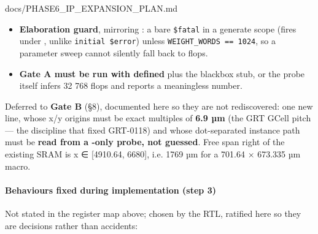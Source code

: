 \begin{relocated}{docs/PHASE6_IP_EXPANSION_PLAN.md}
\begin{itemize}
  regex , matched against the leaf instance name,
  so reusing the name means \textbf{zero config change}; any other name
  silently leaves vccd1/\allowbreak{}vssd1 unconnected, which is the
  PSM-0069 class this flow already fought.
\item
  \textbf{Elaboration guard}, mirroring
  : a bare \texttt{\$fatal} in a
  generate scope (fires under , unlike
  \texttt{initial\ \$error}) unless
  \texttt{WEIGHT\_\allowbreak{}WORDS\ =\allowbreak{}=\allowbreak{}\ 1024},
  so a parameter sweep cannot silently fall back to flops.
\item
  \textbf{Gate A must be run with  defined} plus the
  blackbox stub, or the probe itself infers 32 768 flops and reports a
  meaningless number.
\end{itemize}

Deferred to \textbf{Gate B} (§8), documented here so they are not
rediscovered: one new  line, whose x/y origins
must be exact multiples of \textbf{6.9 µm} (the GRT GCell pitch --- the
discipline that fixed GRT-0118) and whose dot-separated instance path
must be \textbf{read from a -only probe, not
guessed}. Free span right of the existing SRAM is x ∈ {[}4910.64,
6680{]}, i.e. 1769 µm for a 701.64 × 673.335 µm macro.

\paragraph{Behaviours fixed during implementation (step 3)}\label{ds:ch:phase6-ip-expansion-plan:behaviours-fixed-during-implementation-step-3}

Not stated in the register map above; chosen by the RTL, ratified here
so they are decisions rather than accidents:


\end{relocated}
